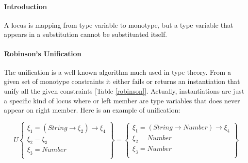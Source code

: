 \documentclass[a4paper]{report}
\newcommand{\reftab}[1]{[Table \ref{#1}]}
\begin{document}
\paragraph{Introduction} A locus is mapping from type variable to monotype, but a type variable that appears in a substitution cannot be substituated itself.

\paragraph{Robinson's Unification} The unification is a well known algorithm much used in type theory. From a given set of monotype constraints it either fails or returns an instantiation that unify all the given constraints \reftab{robinson}. Actually, instantiations are just a specific kind of locus where or left member are type variables that does never appear on right member. Here is an example of unification:

$$
U\left\{\begin{array}{l}
\xi_1 = (String\to \xi_2) \to \xi_4\\
\xi_2 = \xi_3\\
\xi_3 = Number\\
\end{array}\right\}= \left\{\begin{array}{l}
\xi_1 = (String\to Number)\to \xi_4\\
\xi_2 = Number\\
\xi_3 = Number\\
\end{array}\right\}
$$
\end{document}
